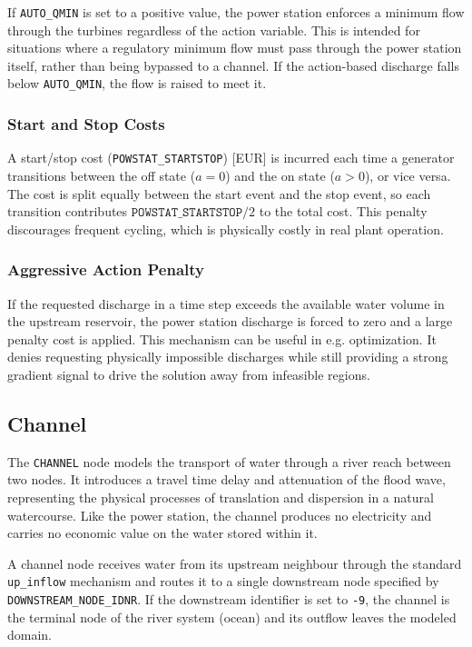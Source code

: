 \documentclass[a4paper, 12pt]{report}
\begin{document}
	If \texttt{AUTO\_QMIN} is set to a positive value, the power station enforces a minimum flow
	through the turbines regardless of the action variable. This is intended for situations where
	a regulatory minimum flow must pass through the power station itself, rather than being
	bypassed to a channel. If the action-based discharge falls below \texttt{AUTO\_QMIN}, the
	flow is raised to meet it.

	\subsubsection{Start and Stop Costs}

	A start/stop cost (\texttt{POWSTAT\_STARTSTOP}) [EUR] is incurred each time a generator
	transitions between the off state ($a = 0$) and the on state ($a > 0$), or vice versa. The
	cost is split equally between the start event and the stop event, so each transition
	contributes $\texttt{POWSTAT\_STARTSTOP} / 2$ to the total cost. This penalty discourages
	frequent cycling, which is physically costly in real plant operation.

	\subsubsection{Aggressive Action Penalty}

	If the requested discharge in a time step exceeds the available water volume in the upstream
	reservoir, the power station discharge is forced to zero and a large penalty cost is applied.
	This mechanism can be useful in e.g. optimization. It denies requesting physically impossible discharges while
	still providing a strong gradient signal to drive the solution away from infeasible regions.
	\newpage 

	\subsection{Channel}
	\label{subsec:channel}

	The \texttt{CHANNEL} node models the transport of water through a river reach between two
	nodes. It introduces a travel time delay and attenuation of the flood wave, representing the
	physical processes of translation and dispersion in a natural watercourse. Like the power
	station, the channel produces no electricity and carries no economic value on the water
	stored within it.

	A channel node receives water from its upstream neighbour through the standard
	\texttt{up\_inflow} mechanism and routes it to a single downstream node specified by
	\texttt{DOWNSTREAM\_NODE\_IDNR}. If the downstream identifier is set to \texttt{-9}, the
	channel is the terminal node of the river system (ocean) and its outflow leaves the modeled domain.
\end{document}
